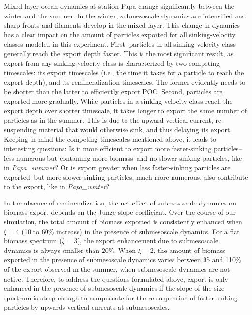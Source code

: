 \documentclass[draft,linenumbers]{agujournal2018}
\begin{document}
Mixed layer ocean dynamics at station Papa change significantly between the winter and the summer. In the winter, submesoscale dynamics are intensified and sharp fronts and filaments develop in the mixed layer. This change in dynamics has a clear impact on the amount of particles exported for all sinking-velocity classes modeled in this experiment. First, particles in all sinking-velocity class generally reach the export depth faster. This is the most significant result, as export from any sinking-velocity class is characterized by two competing timescales: its export timescales (i.e., the time it takes for a particle to reach the export depth), and its remineralization timescales. The former evidently needs to be shorter than the latter to efficiently export POC. Second, particles are exported more gradually. While particles in a sinking-velocity class reach the export depth over shorter timescale, it takes longer to export the same number of particles as in the summer. This is due to the upward vertical current, re-suspending material that would otherwise sink, and thus delaying its export. Keeping in mind the competing timescales mentioned above, it leads to interesting questions: Is it more efficient to export more faster-sinking particles--less numerous but containing more biomass--and no slower-sinking particles, like in \textit{Papa\_summer}? Or is export greater when less faster-sinking particles are exported, but more slower-sinking particles, much more numerous, also contribute to the export, like in \textit{Papa\_winter}?


In the absence of remineralization, the net effect of submesoscale dynamics on biomass export depends on the Junge slope coefficient. Over the course of our simulation, the total amount of biomass exported is consistently enhanced when $\xi = 4$ (10 to 60\% increase) in the presence of submesoscale dynamics. For a flat biomass spectrum ($\xi = 3$), the export enhancement due to submesoscale dynamics is always smaller than 20\%. When $\xi =2$, the amount of biomass exported in the presence of submesoscale dynamics varies between 95 and 110\% of the export observed in the summer, when submesoscale dynamics are not active. Therefore, to address the questions formulated above, export is only enhanced in the presence of submesoscale dynamics if the slope of the size spectrum is steep enough to compensate for the re-suspension of faster-sinking particles by upwards vertical currents at submesoscales. %
\end{document}
